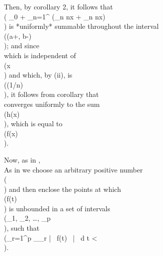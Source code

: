 Then, by  corollary 2,%
it follows that
\\( \alpha_{0} + \sum_{n=1}^{\infty} \left(\alpha_{n} \cos nx + \beta_{n} \sin nx\right)\\)
is *uniformly* summable throughout the interval \\((a+\delta, b-\delta)\\);
and since
\\[ 
\left| \, 
  \alpha_{n} \cos nx + \beta_{n} \sin nx
 \, \right| 
\leq
\sqrt{
  \alpha_{n}^{2} + \beta_{n}^{2}
},
\\] 
which is independent of \\(x\\) and which, by  (ii), %
is \\(\bigO(1/n)\\), it
follows from  corollary that
\\[ 
\frac{1}{2} \alpha_{0} + \sum_{n=1}^{\infty} \left(\alpha_{n} \cos nx + \beta_{n} \sin nx\right)
\\] 
converges uniformly to the sum \\(h(x)\\), which is equal to \\(f(x)\\).

Now, as in ,
\\[ 
S_{m}(x)
-
S_{m}^{(2)}(x)
=
\frac{1}{\pi}
\! \int_{\frac{1}{2} (b-x)}^{\frac{1}{2} \pi}\!
\frac{\sin (2m+1)\theta}{\sin \theta}
f(x + 2\theta)
\, d \theta
+
\frac{1}{\pi}
\! \int_{\frac{1}{2} (x-a)}^{\frac{1}{2} \pi}\!
\frac{\sin (2m+1)\theta}{\sin \theta}
f(x - 2\theta)
\, d \theta.
\\] 
%
%

As in  we choose an arbitrary positive number
\\(\eps\\) and then enclose the points at which \\(f(t)\\) is unbounded in a set of intervals
\\(\delta_{1}, \delta_{2}, \ldots, \delta_{p}\\), such
that
\\(\sum_{r=1}^{p} \int_{\delta_{r}} \left| \, f(t) \, \right|  \, d t < \eps\\).

